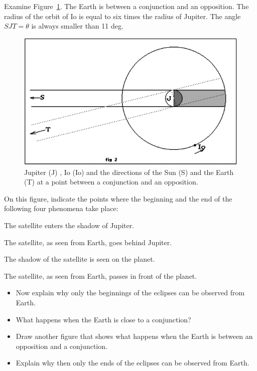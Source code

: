 \documentclass{tufte-handout}
\begin{document}
Examine Figure~\ref{fig:JupIo}. The Earth is between a conjunction and an opposition. The radius of the orbit of Io is equal to six times the radius of Jupiter. The angle $SJT = \theta$ is always smaller than 11 deg.
\begin{figure}
\includegraphics{RomerFig2.png}
\caption{Jupiter (J) , Io (Io) and the directions of the Sun (S) and the Earth (T) at a point between a conjunction and an opposition.}
\label{fig:JupIo}
\end{figure}
On this figure, indicate the points where the beginning and the end of the following four phenomena take place:
\begin{description}[itemsep=0pt,parsep=0pt,topsep=0pt,partopsep=0pt]
\item[Eclipse] The satellite enters the shadow of Jupiter.
\item[Occultation] The satellite, as seen from Earth, goes behind Jupiter.
\item[Shadow] The shadow of the satellite is seen on the planet.
\item[Passage] The satellite, as seen from Earth, passes in front of the planet.
\end{description}

\begin{itemize}
\item Now explain why only the beginnings of the eclipses can be observed from Earth.
\item What happens when the Earth is close to a conjunction?
\item Draw another figure that shows what happens when the Earth is between an opposition and a conjunction. 
\item Explain why then only the ends of the eclipses can be observed from Earth.
\end{itemize}
\end{document}
